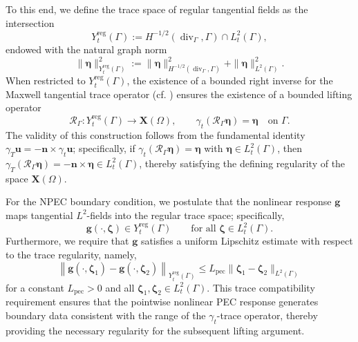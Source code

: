 \documentclass[10pt,a4paper]{amsart}
\numberwithin{equation}{section}
\begin{document}
To this end, we define the trace space of regular tangential fields as the intersection
\[
Y_t^{\mathrm{reg}}(\Gamma) := H^{-1/2}(\operatorname{div}_\Gamma, \Gamma) \cap L_t^2(\Gamma),
\]
endowed with the natural graph norm
\[
\|\boldsymbol{\eta}\|_{Y_t^{\mathrm{reg}}(\Gamma)}^2 := \|\boldsymbol{\eta}\|_{H^{-1/2}(\operatorname{div}_\Gamma, \Gamma)}^2 + \|\boldsymbol{\eta}\|_{L^2(\Gamma)}^2.
\]
When restricted to $Y_t^{\mathrm{reg}}(\Gamma)$, the existence of a bounded right inverse for the Maxwell tangential trace operator (cf. \cite{BuffaCostabelSheen2002, Monk2003}) ensures the existence of a bounded lifting operator
\[
\mathcal{R}_\Gamma \colon Y_t^{\mathrm{reg}}(\Gamma) \to \mathbf{X}(\Omega), \qquad \gamma_t(\mathcal{R}_\Gamma \boldsymbol{\eta}) = \boldsymbol{\eta} \quad \text{on } \Gamma.
\]
The validity of this construction follows from the fundamental identity $\gamma_T \mathbf{u} = -\mathbf{n} \times \gamma_t \mathbf{u}$; specifically, if $\gamma_t(\mathcal{R}_\Gamma \boldsymbol{\eta}) = \boldsymbol{\eta}$ with $\boldsymbol{\eta} \in L_t^2(\Gamma)$, then $\gamma_T(\mathcal{R}_\Gamma \boldsymbol{\eta}) = -\mathbf{n} \times \boldsymbol{\eta} \in L_t^2(\Gamma)$, thereby satisfying the defining regularity of the space $\mathbf{X}(\Omega)$.

For the NPEC boundary condition, we postulate that the nonlinear response $\mathbf{g}$ maps tangential $L^2$-fields into the regular trace space; specifically, 
\[
\mathbf{g}(\cdot, \boldsymbol{\zeta}) \in Y_t^{\mathrm{reg}}(\Gamma) \qquad \text{for all } \boldsymbol{\zeta} \in L_t^2(\Gamma).
\]
Furthermore, we require that $\mathbf{g}$ satisfies a uniform Lipschitz estimate with respect to the trace regularity, namely,
\begin{equation}\label{eq:NPEC_lipschitz_trace}
\left\| \mathbf{g}(\cdot, \boldsymbol{\zeta}_1) - \mathbf{g}(\cdot, \boldsymbol{\zeta}_2) \right\|_{Y_t^{\mathrm{reg}}(\Gamma)} \le L_{\mathrm{pec}} \|\boldsymbol{\zeta}_1 - \boldsymbol{\zeta}_2\|_{L^2(\Gamma)}
\end{equation}
for a constant $L_{\mathrm{pec}} > 0$ and all $\boldsymbol{\zeta}_1, \boldsymbol{\zeta}_2 \in L_t^2(\Gamma)$. This trace compatibility requirement ensures that the pointwise nonlinear PEC response generates boundary data consistent with the range of the $\gamma_t$-trace operator, thereby providing the necessary regularity for the subsequent lifting argument.
\end{document}

